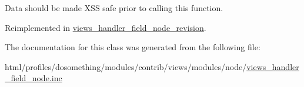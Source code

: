 Data should be made XSS safe prior to calling this function. 

Reimplemented in \hyperlink{classviews__handler__field__node__revision_aefde40c1e00a13cfdf184f31ff07c25b}{views\_\-handler\_\-field\_\-node\_\-revision}.

The documentation for this class was generated from the following file:\begin{DoxyCompactItemize}
\item 
html/profiles/dosomething/modules/contrib/views/modules/node/\hyperlink{views__handler__field__node_8inc}{views\_\-handler\_\-field\_\-node.inc}\end{DoxyCompactItemize}
